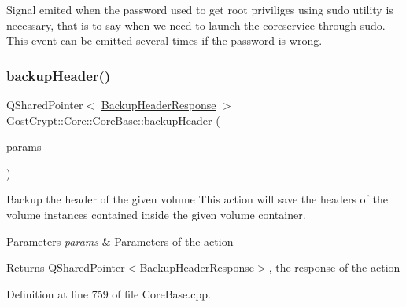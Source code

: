Signal emited when the password used to get root priviliges using sudo utility is necessary, that is to say when we need to launch the coreservice through sudo. This event can be emitted several times if the password is wrong. 

\mbox{\label{class_gost_crypt_1_1_core_1_1_core_base_af5193ba2f99911cb8044038576462d3d}} 
\subsubsection{\texorpdfstring{backup\+Header()}{backupHeader()}}
{\footnotesize\ttfamily Q\+Shared\+Pointer$<$ \hyperlink{struct_gost_crypt_1_1_core_1_1_backup_header_response}{Backup\+Header\+Response} $>$ Gost\+Crypt\+::\+Core\+::\+Core\+Base\+::backup\+Header (\begin{DoxyParamCaption}\item[{Q\+Shared\+Pointer$<$ \hyperlink{struct_gost_crypt_1_1_core_1_1_backup_header_request}{Backup\+Header\+Request} $>$}]{params }\end{DoxyParamCaption})\hspace{0.3cm}{\ttfamily [protected]}}



Backup the header of the given volume This action will save the headers of the volume instances contained inside the given volume container. 


\begin{DoxyParams}{Parameters}
{\em params} & Parameters of the action \\
\hline
\end{DoxyParams}
\begin{DoxyReturn}{Returns}
Q\+Shared\+Pointer$<$\+Backup\+Header\+Response$>$, the response of the action 
\end{DoxyReturn}


Definition at line 759 of file Core\+Base.\+cpp.

\mbox{\label{class_gost_crypt_1_1_core_1_1_core_base_a3591596ab66503c56dde92619938fffc}} 
